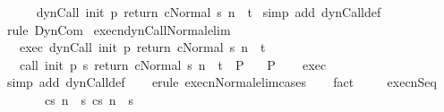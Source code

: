 \begin{isabellebody}
\ \ {\isasymLongrightarrow}\ \isanewline
\ \ {\isasymGamma}{\isasymturnstile}{\isasymlangle}dynCall\ init\ p\ return\ c{\isacharcomma}Normal\ s{\isasymrangle}\ {\isacharequal}n{\isasymRightarrow}\ \ t{\isachardoublequoteclose}\isanewline
%
\isadelimproof
%
\endisadelimproof
%
\isatagproof
{}\isamarkupfalse%
\ {\isacharparenleft}simp\ add{\isacharcolon}\ dynCall{\isacharunderscore}def{\isacharparenright}\isanewline
{}\isamarkupfalse%
\ {\isacharparenleft}rule\ DynCom{\isacharparenright}%
\endisatagproof
{\isafoldproof}%
%
\isadelimproof
\isanewline
%
\endisadelimproof
\isanewline
{}\isamarkupfalse%
\ execn{\isacharunderscore}dynCall{\isacharunderscore}Normal{\isacharunderscore}elim{\isacharcolon}\isanewline
\ \ \ exec{\isacharcolon}\ {\isachardoublequoteopen}{\isasymGamma}{\isasymturnstile}{\isasymlangle}dynCall\ init\ p\ return\ c{\isacharcomma}Normal\ s{\isasymrangle}\ {\isacharequal}n{\isasymRightarrow}\ \ t{\isachardoublequoteclose}\isanewline
\ \ \ {\isachardoublequoteopen}{\isasymGamma}{\isasymturnstile}{\isasymlangle}call\ init\ {\isacharparenleft}p\ s{\isacharparenright}\ return\ c{\isacharcomma}Normal\ s{\isasymrangle}\ {\isacharequal}n{\isasymRightarrow}\ \ t\ {\isasymLongrightarrow}\ P{\isachardoublequoteclose}\isanewline
\ \ \ {\isachardoublequoteopen}P{\isachardoublequoteclose}\isanewline
%
\isadelimproof
\ \ %
\endisadelimproof
%
\isatagproof
{}\isamarkupfalse%
\ exec\isanewline
\ \ \isamarkupfalse%
\ {\isacharparenleft}simp\ add{\isacharcolon}\ dynCall{\isacharunderscore}def{\isacharparenright}\isanewline
\ \ \isamarkupfalse%
\ {\isacharparenleft}erule\ execn{\isacharunderscore}Normal{\isacharunderscore}elim{\isacharunderscore}cases{\isacharparenright}\isanewline
\ \ \isamarkupfalse%
\ fact\isanewline
\ \ \isamarkupfalse%
%
\endisatagproof
{\isafoldproof}%
%
\isadelimproof
\isanewline
%
\endisadelimproof
\isanewline
\isanewline
\isanewline
\isanewline
\isanewline
{}\isamarkupfalse%
\ \ execn{\isacharunderscore}Seq{\isacharprime}{\isacharcolon}\ \isanewline
\ \ \ \ \ \ \ {\isachardoublequoteopen}{\isasymlbrakk}{\isasymGamma}{\isasymturnstile}{\isasymlangle}c{}{\isacharcomma}s{\isasymrangle}\ {\isacharequal}n{\isasymRightarrow}\ \ s{\isacharprime}{\isacharsemicolon}\ {\isasymGamma}{\isasymturnstile}{\isasymlangle}c{}{\isacharcomma}s{\isacharprime}{\isasymrangle}\ {\isacharequal}n{\isasymRightarrow}\ \ s{\isacharprime}{\isacharprime}{\isasymrbrakk}\isanewline

\end{isabellebody}
